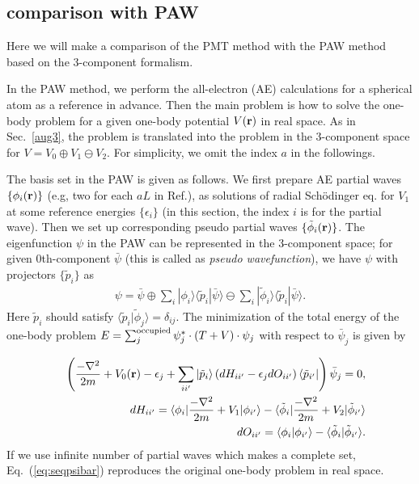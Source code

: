 \documentclass[a4paper,10pt,aip,onecolumn,amsmath,amssymb,floatfix,rmp]{revtex4-1}
\newcommand{\bfr}{{\bf r}}
\def\tphi{{\tilde{\phi}}}
\newcommand{\req}[1]{\mbox{Eq.~\!(\ref{#1})}}
\newcommand{\refsec}[1]{\mbox{Sec.~\!\ref{#1}}}
\begin{document}
\begin{widetext}
\subsection{comparison with PAW}
\label{sec:comparison}
Here we will make a comparison of the PMT method with the PAW method
\cite{PAW,kresse99} based on the 3-component formalism.

In the PAW method, we perform the all-electron (AE) 
calculations for a spherical atom as a reference in advance.
Then the main problem is how to solve the one-body problem
for a given one-body potential $V(\bfr)$ in real space. 
As in \refsec{aug3}, the problem is translated into the problem in the 3-component space
for $V=V_0\oplus V_1 \ominus V_2$.
For simplicity, we omit the index $a$ in the followings.

The basis set in the PAW is given as follows.
We first prepare AE partial waves
$\{\phi_i(\bfr)\}$ (e.g, two for each $aL$ in Ref.\cite{kresse99}),
as solutions of radial Sch\"odinger eq. for $V_1$ at some reference 
energies $\{\epsilon_i\}$ (in this section, the index $i$ is for the
partial wave). Then we set up corresponding
pseudo partial waves $\{\tilde{\phi}_i(\bfr)\}$.
The eigenfunction $\psi$ in the PAW can be represented 
in the 3-component space; for given 0th-component $\bar{\psi}$
(this is called as {\it pseudo wavefunction}), we have
$\psi$ with projectors $\{\tilde{p}_i\}$ as
\begin{eqnarray}
\psi=\bar{\psi}
\oplus \sum_i |\phi_i\rangle \langle \tilde{p}_i|\bar{\psi}\rangle
\ominus \sum_i |\tilde{\phi}_i \rangle \langle
\tilde{p}_i|\bar{\psi}\rangle.
\label{eq:psibar}
\end{eqnarray}
Here $\tilde{p}_i$ should satisfy
$\langle \tilde{p}_i|\tilde{\phi}_j \rangle=\delta_{ij}$.
The minimization of the total energy of the one-body problem 
$E= \sum_j^{\rm occupied} \psi_j^* \cdot (T+V) \cdot \psi_j$
with respect to $\bar{\psi}_j$ is given by
\begin{widetext}
\begin{eqnarray}
&&\left( \frac{-\nabla^2}{2m}+V_0(\bfr)-\epsilon_j +
 \sum_{ii'}  
  |\tilde{p}_i \rangle  
   \left(dH_{ii'}-\epsilon_j dO_{ii'} \right)  
  \langle \tilde{p}_{i'}| 
\right) \bar{\psi}_j=0, \label{eq:seqpsibar}\\
&&dH_{ii'}= \langle \phi_i| \frac{-\nabla^2}{2m}+V_1|\phi_{i'}\rangle  
 -  \langle \tphi_i| \frac{-\nabla^2}{2m}+V_2|\tphi_{i'}\rangle \\
&&dO_{ii'}= \langle \phi_i|\phi_{i'}\rangle  
 -  \langle \tphi_i| \tphi_{i'}\rangle.
\end{eqnarray}
If we use infinite number of partial waves which makes a complete set, 
\req{eq:seqpsibar} reproduces the original one-body problem in real space.


\end{widetext}
\end{widetext}
\end{document}
